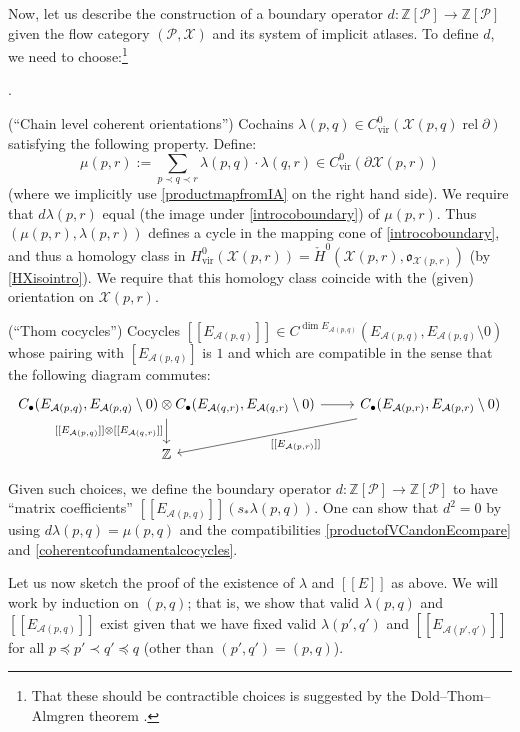 \documentclass[12pt]{article}
\theoremstyle{definition}
\theoremstyle{remark}
\numberwithin{equation}{subsection}
\newcommand{\oo}{\mathfrak o}
\newcommand{\X}{\mathcal X}
\newcommand{\ZZ}{\mathbb Z}
\newcommand{\PPP}{\mathcal P}
\newcommand{\A}{\mathcal A}
\newcommand{\cH}{\check H}
\newcommand{\vir}{\mathrm{vir}}
\newcommand{\rel}{\operatorname{rel}}
\newcounter{rcounti}
\newenvironment{rlist}{\begin{list}{\roman{rcounti}.}{\usecounter{rcounti}
\setlength\itemsep{0pt}
\setlength\labelsep{4pt}
\setlength\labelwidth{16pt}
\setlength\leftmargin{32pt}
\setlength\listparindent{0pt}
\setlength\parsep{0pt}
\setlength\parskip{0pt}
\setlength\partopsep{0pt}
\setlength\rightmargin{0pt}
\setlength\topsep{0pt}
\setlength\itemindent{0pt}
}}{\end{list}}
\begin{document}
Now, let us describe the construction of a boundary operator $d:\ZZ[\PPP]\to\ZZ[\PPP]$ given the flow category $(\PPP,\X)$ and its system of implicit atlases.  To define $d$, we need to choose:\footnote{That these should be contractible choices is suggested by the Dold--Thom--Almgren theorem \cite{almgren} \cite[p430]{gromovI}.}
\begin{rlist}
\item(``Chain level coherent orientations'') Cochains $\lambda(p,q)\in C^0_\vir(\X(p,q)\rel\partial)$ satisfying the following property.  Define:
\begin{equation}\label{boundarychainlevelcoherent}
\mu(p,r):=\sum_{p\prec q\prec r}\lambda(p,q)\cdot\lambda(q,r)\in C_\vir^0(\partial\X(p,r))
\end{equation}
(where we implicitly use \eqref{productmapfromIA} on the right hand side).  We require that $d\lambda(p,r)$ equal (the image under \eqref{introcoboundary}) of $\mu(p,r)$.  Thus $(\mu(p,r),\lambda(p,r))$ defines a cycle in the mapping cone of \eqref{introcoboundary}, and thus a homology class in $H^0_\vir(\X(p,r))=\cH^0(\X(p,r),\oo_{\X(p,r)})$ (by \eqref{HXisointro}).  We require that this homology class coincide with the (given) orientation on $\X(p,r)$.
\item(``Thom cocycles'') Cocycles $[[E_{\A(p,q)}]]\in C^{\dim E_{\A(p,q)}}(E_{\A(p,q)},E_{\A(p,q)}\setminus 0)$ whose pairing with $[E_{\A(p,q)}]$ is $1$ and which are compatible in the sense that the following diagram commutes:
\begin{equation}\label{coherentcofundamentalcocycles}
\hspace{-1.5cm}
\begin{tikzcd}
C_\bullet(E_{\A(p,q)},E_{\A(p,q)}\setminus 0)\otimes C_\bullet(E_{\A(q,r)},E_{\A(q,r)}\setminus 0)\ar{r}\ar{d}[swap]{[[E_{\A(p,q)}]]\otimes[[E_{\A(q,r)}]]}&C_\bullet(E_{\A(p,r)},E_{\A(p,r)}\setminus 0)\ar{ld}{[[E_{\A(p,r)}]]}\\
\ZZ
\end{tikzcd}
\hspace{-1.5cm}
\end{equation}
\end{rlist}
Given such choices, we define the boundary operator $d:\ZZ[\PPP]\to\ZZ[\PPP]$ to have ``matrix coefficients'' $[[E_{\A(p,q)}]](s_\ast\lambda(p,q))$.  One can show that $d^2=0$ by using $d\lambda(p,q)=\mu(p,q)$ and the compatibilities \eqref{productofVCandonEcompare} and \eqref{coherentcofundamentalcocycles}.

Let us now sketch the proof of the existence of $\lambda$ and $[[E]]$ as above.  We will work by induction on $(p,q)$; that is, we show that valid $\lambda(p,q)$ and $[[E_{\A(p,q)}]]$ exist given that we have fixed valid $\lambda(p',q')$ and $[[E_{\A(p',q')}]]$ for all $p\preceq p'\prec q'\preceq q$ (other than $(p',q')=(p,q)$).
\end{document}
